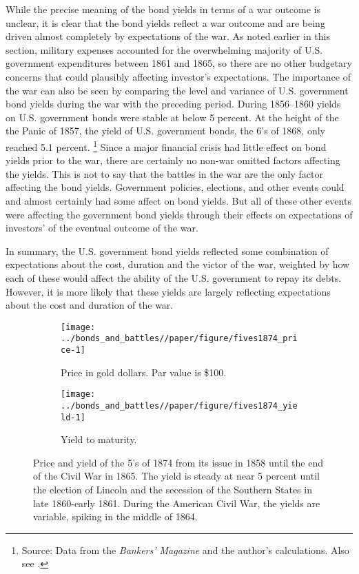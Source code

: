 
While the precise meaning of the bond yields in terms of a war outcome is unclear, it is clear that the bond yields reflect a war outcome and are being driven almost completely by expectations of the war.
As noted earlier in this section, military expenses accounted for the overwhelming majority of U.S. government expenditures between 1861 and 1865, so there are no other budgetary concerns that could plausibly affecting investor's expectations.
The importance of the war can also be seen by comparing the level and variance of U.S. government bond yields during the war with the preceding period.
During 1856--1860 yields on U.S. government bonds were stable at below 5 percent.
At the height of the the Panic of 1857, the yield of U.S. government bonds, the 6's of 1868, only reached 5.1 percent.%
\footnote{Source: Data from the \textit{Bankers' Magazine} and the author's calculations. Also see \textcite{HomerSylla2005}.}
Since a major financial crisis had little effect on bond yields prior to the war, there are certainly no non-war omitted factors affecting the yields.
This is not to say that the battles in the war are the only factor affecting the bond yields.
Government policies, elections, and other events could and almost certainly had some affect on bond yields.
But all of these other events were affecting the government bond yields through their effects on expectations of investors' of the eventual outcome of the war.

In summary, the U.S. government bond yields reflected some combination of expectations about the cost, duration and the victor of the war, weighted by how each of these would affect the ability of the U.S. government to repay its debts.
However, it is more likely that these yields are largely reflecting expectations about the cost and duration of the war.

\begin{figure}[!]
  \centering
  \begin{subfigure}[b]{\linewidth}
   \texttt{[image: ../bonds\_and\_battles//paper/figure/fives1874\_price-1]}
  \caption{Price in gold dollars. Par value is \$100.}
  \label{bonds:fig:fives1874_price}
\end{subfigure}
\begin{subfigure}[b]{\linewidth}
   \texttt{[image: ../bonds\_and\_battles//paper/figure/fives1874\_yield-1]}
  \caption{Yield to maturity.}
  \label{bonds:fig:fives1874_yield}
\end{subfigure}
\caption[Price and yield of the 5's of 1874, 1858-1865]{Price and yield of the 5's of 1874 from its issue in 1858 until the end of the Civil War in 1865.
The yield is steady at near 5 percent until the election of Lincoln and the secession of the Southern States in late 1860-early 1861.
During the American Civil War, the yields are variable, spiking in the middle of 1864.
 }
\label{bonds:fig:fives1874_yield_price}
\end{figure}

